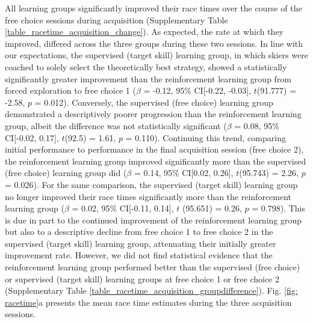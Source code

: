 All learning groups significantly improved their race times over the course of the free choice sessions during acquisition (Supplementary Table \ref{table_racetime_acquisition_change}). As expected, the rate at which they improved, differed across the three groups during these two sessions. In line with our expectations, the supervised (target skill) learning group, in which skiers were coached to solely select the theoretically best strategy, showed a statistically significantly greater improvement than the reinforcement learning group from forced exploration to free choice 1  ($\beta$ = -0.12, 95\% CI[-0.22, -0.03], $t$(91.777) = -2.58, $p$ = 0.012). Conversely, the supervised (free choice) learning group demonstrated a descriptively poorer progression than the reinforcement learning group, albeit the difference was not statistically significant ($\beta$ = 0.08, 95\% CI[-0.02, 0.17], $t$(92.5) = 1.61, $p$ = 0.110). Continuing this trend, comparing initial performance to performance in the final acquisition session (free choice 2), the reinforcement learning group improved significantly more than the supervised (free choice) learning group did  ($\beta$ = 0.14, 95\% CI[0.02, 0.26], $t$(95.743) = 2.26, $p$ = 0.026). For the same comparison, the supervised (target skill) learning group no longer improved their race times significantly more than the reinforcement learning group ($\beta$
 = 0.02, 95\% CI[-0.11, 0.14], $t$
(95.651) = 0.26, $p$ = 0.798). This is due in part to the continued improvement of the reinforcement learning group but also to a descriptive decline from free choice 1 to free choice 2 in the supervised (target skill) learning group, attenuating their initially greater improvement rate. However, we did not find statistical evidence that the reinforcement learning group performed better than the supervised (free choice) or supervised (target skill) learning groups at free choice 1 or free choice 2 (Supplementary Table \ref{table_racetime_acquisition_groupdifference}). Fig. \ref{fig: racetime}a presents the mean race time estimates during the three acquisition sessions. 


